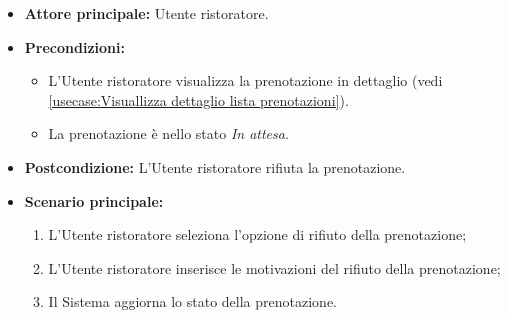 \label{usecase:Rifiuta prenotazione}
\begin{itemize}
	\item \textbf{Attore principale:} Utente ristoratore.

	\item \textbf{Precondizioni:}
	      \begin{itemize}
		      \item L'Utente ristoratore visualizza la prenotazione in dettaglio (vedi \autoref{usecase:Visuallizza dettaglio lista prenotazioni}).
		      \item La prenotazione è nello stato \textit{In attesa}.
	      \end{itemize}

	\item \textbf{Postcondizione:} L'Utente ristoratore rifiuta la prenotazione.



	\item \textbf{Scenario principale:}
	      \begin{enumerate}
		      \item L'Utente ristoratore seleziona l'opzione di rifiuto della prenotazione;

		      \item L'Utente ristoratore inserisce le motivazioni del rifiuto della prenotazione;

		      \item Il Sistema aggiorna lo stato della prenotazione.

	      \end{enumerate}
\end{itemize}

